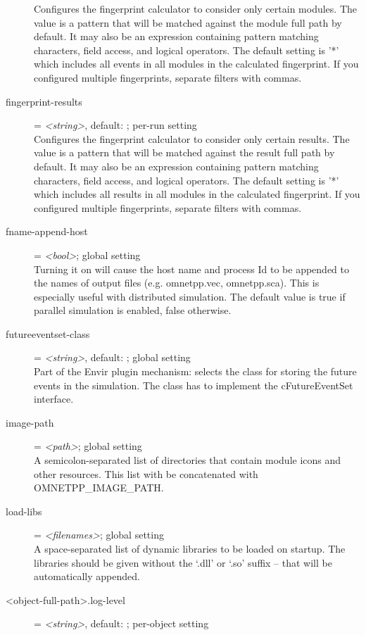 \begin{description}
    Configures the fingerprint calculator to consider only certain modules. The
    value is a pattern that will be matched against the module full path by
    default. It may also be an expression containing pattern matching
    characters, field access, and logical operators. The default setting is '*'
    which includes all events in all modules in the calculated fingerprint. If
    you configured multiple fingerprints, separate filters with commas.
\item[fingerprint-results] = \textit{<string>}, default: \ttt{*}; per-run setting \\
    Configures the fingerprint calculator to consider only certain results. The
    value is a pattern that will be matched against the result full path by
    default. It may also be an expression containing pattern matching
    characters, field access, and logical operators. The default setting is '*'
    which includes all results in all modules in the calculated fingerprint. If
    you configured multiple fingerprints, separate filters with commas.
\item[fname-append-host] = \textit{<bool>}; global setting \\
    Turning it on will cause the host name and process Id to be appended to the
    names of output files (e.g. omnetpp.vec, omnetpp.sca). This is especially
    useful with distributed simulation. The default value is true if parallel
    simulation is enabled, false otherwise.
\item[futureeventset-class] = \textit{<string>}, default: ; global setting \\
    Part of the Envir plugin mechanism: selects the class for storing the
    future events in the simulation. The class has to implement the
    cFutureEventSet interface.
\item[image-path] = \textit{<path>}; global setting \\
    A semicolon-separated list of directories that contain module icons and
    other resources. This list with be concatenated with OMNETPP\_IMAGE\_PATH.
\item[load-libs] = \textit{<filenames>}; global setting \\
    A space-separated list of dynamic libraries to be loaded on startup. The
    libraries should be given without the `.dll' or `.so' suffix -- that will
    be automatically appended.
\item[<object-full-path>.log-level] = \textit{<string>}, default: ; per-object setting \\

\end{description}
